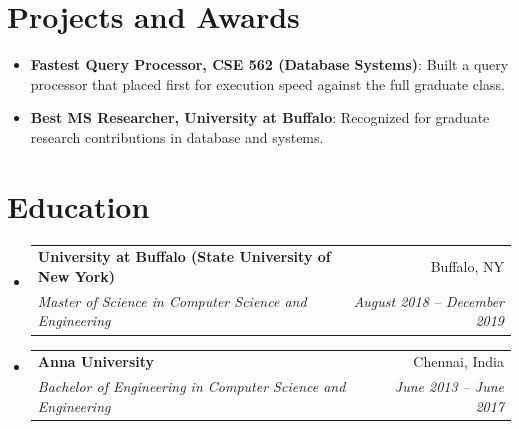 \documentclass[letterpaper,10pt]{article}
\makeatletter
\newcommand{\resumeSubheading}[4]{%
  \vspace{-1pt}\item
  \begin{tabular*}{0.97\textwidth}[t]{l@{\extracolsep{\fill}}r}
    \textbf{#1} & #2 \\
    \textit{\small#3} & \textit{\small #4} \\
  \end{tabular*}\vspace{-5pt}
}
\newcommand{\resumeSubHeadingListStart}{\begin{itemize}[leftmargin=*]}
\newcommand{\resumeSubHeadingListEnd}{\end{itemize}}
\makeatother
\begin{document}
\section{Projects and Awards}
\resumeSubHeadingListStart
  \item{\textbf{Fastest Query Processor, CSE 562 (Database Systems)}: Built a query processor that placed first for execution speed against the full graduate class.}
  \item{\textbf{Best MS Researcher, University at Buffalo}: Recognized for graduate research contributions in database and systems.}
\resumeSubHeadingListEnd

\section{Education}
\resumeSubHeadingListStart
  \resumeSubheading
    {University at Buffalo (State University of New York)}{Buffalo, NY}
    {Master of Science in Computer Science and Engineering}{August 2018 -- December 2019}
  \vspace{4pt}
  \resumeSubheading
    {Anna University}{Chennai, India}
    {Bachelor of Engineering in Computer Science and Engineering}{June 2013 -- June 2017}
\resumeSubHeadingListEnd
\end{document}
